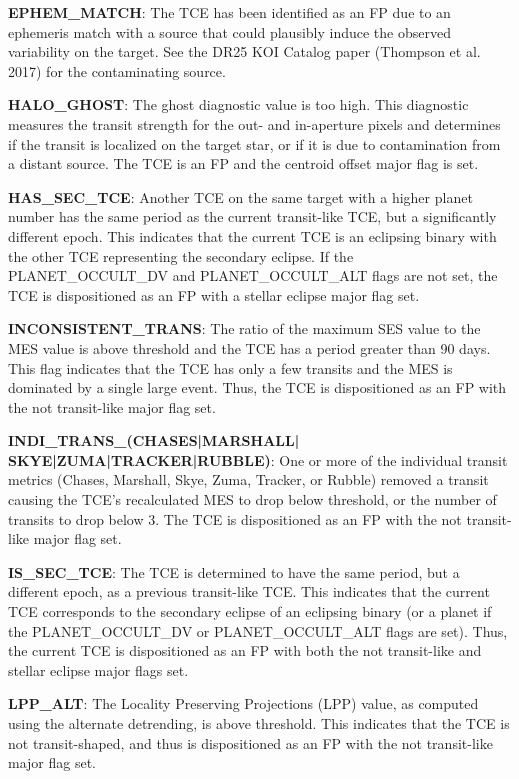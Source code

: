 \textbf{EPHEM\_MATCH}: The TCE has been identified as an FP due to an ephemeris match with a source that could plausibly induce the observed variability on the target. See the DR25 KOI Catalog paper (Thompson et al. 2017) for the contaminating source.

\textbf{HALO\_GHOST}: The ghost diagnostic value is too high. This diagnostic measures the transit strength for the out- and in-aperture pixels and determines if the transit is localized on the target star, or if it is due to contamination from a distant source. The TCE is an FP and the centroid offset major flag is set.

\textbf{HAS\_SEC\_TCE}: Another TCE on the same target with a higher planet number has the same period as the current transit-like TCE, but a significantly different epoch. This indicates that the current TCE is an eclipsing binary with the other TCE representing the secondary eclipse. If the PLANET\_OCCULT\_DV and PLANET\_OCCULT\_ALT flags are not set, the TCE is dispositioned as an FP with a stellar eclipse major flag set.

\textbf{INCONSISTENT\_TRANS}: The ratio of the maximum SES value to the MES value is above threshold and the TCE has a period greater than 90 days. This flag indicates that the TCE has only a few transits and the MES is dominated by a single large event. Thus, the TCE is dispositioned as an FP with the not transit-like major flag set.

\textbf{INDI\_TRANS\_(CHASES|MARSHALL|\\SKYE|ZUMA|TRACKER|RUBBLE)}: One or more of the individual transit metrics (Chases, Marshall, Skye, Zuma, Tracker, or Rubble) removed a transit causing the TCE's recalculated MES to drop below threshold, or the number of transits to drop below 3. The TCE is dispositioned as an FP with the not transit-like major flag set.

\textbf{IS\_SEC\_TCE}: The TCE is determined to have the same period, but a different epoch, as a previous transit-like TCE. This indicates that the current TCE corresponds to the secondary eclipse of an eclipsing binary (or a planet if the PLANET\_OCCULT\_DV or PLANET\_OCCULT\_ALT flags are set). Thus, the current TCE is dispositioned as an FP with both the not transit-like and stellar eclipse major flags set.

\textbf{LPP\_ALT}: The Locality Preserving Projections (LPP) value\citet{Thompson2015b}, as computed using the alternate detrending, is above threshold. This indicates that the TCE is not transit-shaped, and thus is dispositioned as an FP with the not transit-like major flag set.

